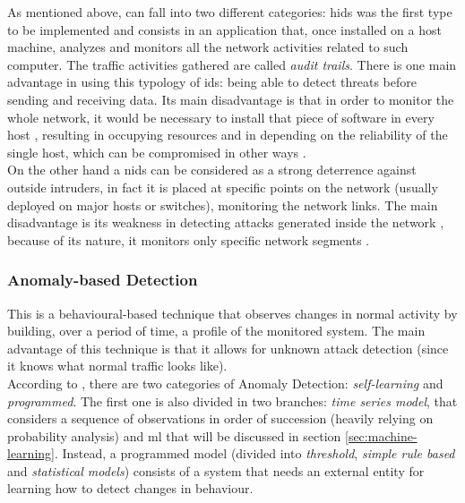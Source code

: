 As mentioned above,  can fall into two different categories: \gls{hids} was the first type to be implemented \cite{Debar1999} and consists in an application that, once installed on a host machine, analyzes and monitors all the network activities related to such computer. The traffic activities gathered are called \textit{audit trails}. There is one main advantage in using this typology of \gls{ids}: being able to detect threats before sending and receiving data. Its main disadvantage is that in order to monitor the whole network, it would be necessary to install that piece of software in every host \cite{Hodo2017}, resulting in occupying resources and in depending on the reliability of the single host, which can be compromised in other ways \cite{Liu2019}. \\ On the other hand a \gls{nids} can be considered as a strong deterrence against outside intruders, in fact it is placed at specific points on the network (usually deployed on major hosts or switches), monitoring the network links. The main disadvantage is its weakness in detecting attacks generated inside the network \cite{Hodo2017}, because of its nature, it monitors only specific network segments \cite{Liu2019}.


\subsubsection{Anomaly-based Detection}
\label{subsubsec:anomaly-detection}

This is a behavioural-based technique that observes changes in normal activity by building, over a period of time, a profile of the monitored system. The main advantage of this technique is that it allows for unknown attack detection (since it knows what normal traffic looks like). \\ According to \cite{Hodo2017}, there are two categories of Anomaly Detection: \textit{self-learning} and \textit{programmed}. The first one is also divided in two branches: \textit{time series model}, that considers a sequence of observations in order of succession (heavily relying on probability analysis) and \gls{ml} that will be discussed in section \ref{sec:machine-learning}. Instead, a programmed model (divided into \textit{threshold}, \textit{simple rule based} and \textit{statistical models}) consists of a system that needs an external entity for learning how to detect changes in behaviour.

